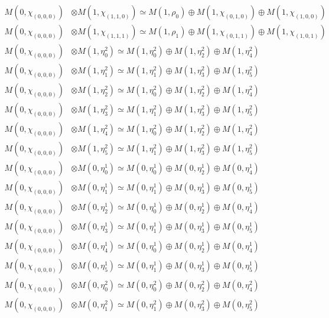 \begin{align*}
M(0,\chi_{(0,0,0)}) &\otimes M(1,\chi_{(1,1,0)}) \simeq M(1,\rho_{0}) \oplus M(1,\chi_{(0,1,0)}) \oplus M(1,\chi_{(1,0,0)}) \\
M(0,\chi_{(0,0,0)}) &\otimes M(1,\chi_{(1,1,1)}) \simeq M(1,\rho_{1}) \oplus M(1,\chi_{(0,1,1)}) \oplus M(1,\chi_{(1,0,1)}) \\
M(0,\chi_{(0,0,0)}) &\otimes M(1,\eta^{2}_{0}) \simeq M(1,\eta^{2}_{0}) \oplus M(1,\eta^{2}_{2}) \oplus M(1,\eta^{2}_{4}) \\
M(0,\chi_{(0,0,0)}) &\otimes M(1,\eta^{2}_{1}) \simeq M(1,\eta^{2}_{1}) \oplus M(1,\eta^{2}_{3}) \oplus M(1,\eta^{2}_{5}) \\
M(0,\chi_{(0,0,0)}) &\otimes M(1,\eta^{2}_{2}) \simeq M(1,\eta^{2}_{0}) \oplus M(1,\eta^{2}_{2}) \oplus M(1,\eta^{2}_{4}) \\
M(0,\chi_{(0,0,0)}) &\otimes M(1,\eta^{2}_{3}) \simeq M(1,\eta^{2}_{1}) \oplus M(1,\eta^{2}_{3}) \oplus M(1,\eta^{2}_{5}) \\
M(0,\chi_{(0,0,0)}) &\otimes M(1,\eta^{2}_{4}) \simeq M(1,\eta^{2}_{0}) \oplus M(1,\eta^{2}_{2}) \oplus M(1,\eta^{2}_{4}) \\
M(0,\chi_{(0,0,0)}) &\otimes M(1,\eta^{2}_{5}) \simeq M(1,\eta^{2}_{1}) \oplus M(1,\eta^{2}_{3}) \oplus M(1,\eta^{2}_{5}) \\
M(0,\chi_{(0,0,0)}) &\otimes M(0,\eta^{1}_{0}) \simeq M(0,\eta^{1}_{0}) \oplus M(0,\eta^{1}_{2}) \oplus M(0,\eta^{1}_{4}) \\
M(0,\chi_{(0,0,0)}) &\otimes M(0,\eta^{1}_{1}) \simeq M(0,\eta^{1}_{1}) \oplus M(0,\eta^{1}_{3}) \oplus M(0,\eta^{1}_{5}) \\
M(0,\chi_{(0,0,0)}) &\otimes M(0,\eta^{1}_{2}) \simeq M(0,\eta^{1}_{0}) \oplus M(0,\eta^{1}_{2}) \oplus M(0,\eta^{1}_{4}) \\
M(0,\chi_{(0,0,0)}) &\otimes M(0,\eta^{1}_{3}) \simeq M(0,\eta^{1}_{1}) \oplus M(0,\eta^{1}_{3}) \oplus M(0,\eta^{1}_{5}) \\
M(0,\chi_{(0,0,0)}) &\otimes M(0,\eta^{1}_{4}) \simeq M(0,\eta^{1}_{0}) \oplus M(0,\eta^{1}_{2}) \oplus M(0,\eta^{1}_{4}) \\
M(0,\chi_{(0,0,0)}) &\otimes M(0,\eta^{1}_{5}) \simeq M(0,\eta^{1}_{1}) \oplus M(0,\eta^{1}_{3}) \oplus M(0,\eta^{1}_{5}) \\
M(0,\chi_{(0,0,0)}) &\otimes M(0,\eta^{2}_{0}) \simeq M(0,\eta^{2}_{0}) \oplus M(0,\eta^{2}_{2}) \oplus M(0,\eta^{2}_{4}) \\
M(0,\chi_{(0,0,0)}) &\otimes M(0,\eta^{2}_{1}) \simeq M(0,\eta^{2}_{1}) \oplus M(0,\eta^{2}_{3}) \oplus M(0,\eta^{2}_{5}) \\

\end{align*}
